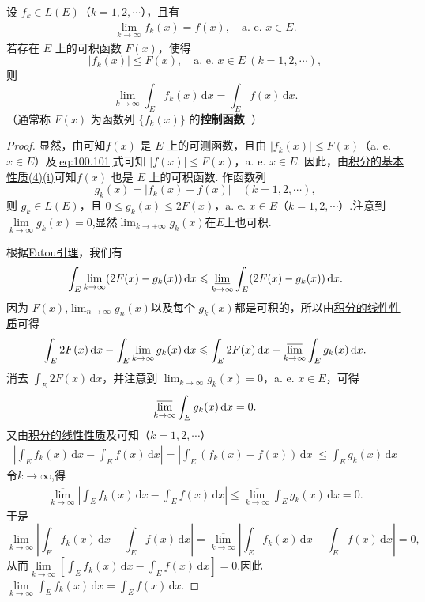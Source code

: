 \documentclass[../../main.tex]{subfiles}%
\begin{document}
\begin{theorem}[控制收敛定理]\label{theorem:控制收敛定理}
设 $f_k \in L(E)$（$k = 1, 2, \cdots$），且有
\begin{align}\label{eq:100.101}
\lim_{k \to \infty} f_k(x) = f(x), \quad \text{a. e. } x \in E.
\end{align}
若存在 $E$ 上的可积函数 $F(x)$，使得
\[
|f_k(x)| \leqslant F(x), \quad \text{a. e. } x \in E \ (k = 1, 2, \cdots),
\]
则
\[
\lim_{k \to \infty} \int_E f_k(x) \, \mathrm{d}x = \int_E f(x) \, \mathrm{d}x. 
\]
（通常称 $F(x)$ 为函数列 $\{ f_k(x) \}$ 的\textbf{控制函数}. ）
\end{theorem}
\begin{proof}

显然，由可知$f(x)$ 是 $E$ 上的可测函数，且由 $|f_k(x)| \leqslant F(x)$（a. e. $x \in E$）及\eqref{eq:100.101}式可知 $|f(x)| \leqslant F(x)$，a. e. $x \in E$. 因此，由\hyperref[theorem:积分的基本性质]{积分的基本性质(4)(i)}可知$f(x)$ 也是 $E$ 上的可积函数. 作函数列
\[
g_k(x) = |f_k(x) - f(x)| \quad (k = 1, 2, \cdots),
\]
则 $g_k \in L(E)$，且 $0 \leqslant g_k(x) \leqslant 2F(x)$，a. e. $x \in E$（$k = 1, 2, \cdots$）.注意到$\underset{k\rightarrow \infty}{\lim}g_k\left( x \right) =0$,显然$\lim_{k\to +\infty}g_k(x)$在$E$上也可积.

根据\hyperref[theorem:Fatou引理]{Fatou引理}，我们有
\[
\int_E \lim_{k \to \infty} (2F(x) - g_k(x)) \, \mathrm{d}x \leqslant \varliminf_{k \to \infty} \int_E (2F(x) - g_k(x)) \, \mathrm{d}x.
\]
因为 $F(x)$,$\lim_{n\to \infty}g_n(x)$以及每个 $g_k(x)$都是可积的，所以由\hyperref[theorem:积分的线性性质]{积分的线性性质}可得
\[
\int_E 2F(x) \, \mathrm{d}x - \int_E \lim_{k \to \infty} g_k(x) \, \mathrm{d}x \leqslant \int_E 2F(x) \, \mathrm{d}x - \varlimsup_{k \to \infty} \int_E g_k(x) \, \mathrm{d}x.
\]
消去 $\int_E 2F(x) \, \mathrm{d}x$，并注意到 $\lim_{k \to \infty} g_k(x) = 0$，a. e. $x \in E$，可得
\[
\varlimsup_{k \to \infty} \int_E g_k(x) \, \mathrm{d}x = 0.
\]
又由\hyperref[theorem:积分的线性性质]{积分的线性性质}及可知（$k = 1, 2, \cdots$）
\begin{align*}
\left| \int_E f_k(x) \, \mathrm{d}x - \int_E f(x) \, \mathrm{d}x \right| = \left| \int_E (f_k(x) - f(x)) \, \mathrm{d}x \right| 
\leqslant \int_E g_k(x) \, \mathrm{d}x
\end{align*}
令$k\to \infty$,得
\begin{align*}
\underset{k\rightarrow \infty}{\overline{\lim }}\left| \int_E{f_k(x)\,\mathrm{d}x}-\int_E{f(x)\,\mathrm{d}x} \right|\leqslant \underset{k\rightarrow \infty}{\overline{\lim }}\int_E{g_k(x)\,\mathrm{d}x}=0.
\end{align*}
于是$$\underset{k\rightarrow \infty}{\lim}\left| \int_E{f_k(x)\,\mathrm{d}x}-\int_E{f(x)\,\mathrm{d}x} \right|=\underset{k\rightarrow \infty}{\overline{\lim }}\left| \int_E{f_k(x)\,\mathrm{d}x}-\int_E{f(x)\,\mathrm{d}x} \right|=0,$$
从而$\underset{k\rightarrow \infty}{\lim}\left[ \int_E{f_k(x)\,\mathrm{d}x}-\int_E{f(x)\,\mathrm{d}x} \right] =0$.因此$\underset{k\rightarrow \infty}{\lim}\int_E{f_k(x)\,\mathrm{d}x}=\int_E{f(x)\,\mathrm{d}x}.$

\end{proof}
\end{document}
